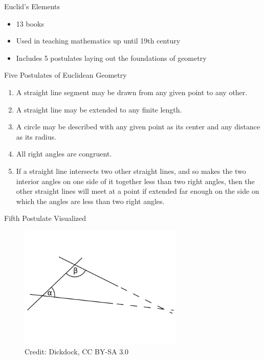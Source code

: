 \documentclass[utf8]{beamer}
\begin{document}
\begin{frame}{Euclid's Elements}
\begin{itemize}
\item 13 books
\item Used in teaching mathematics up until 19th century
\item Includes 5 postulates laying out the foundations of geometry
\end{itemize}
\end{frame}

\begin{frame}{Five Postulates of Euclidean Geometry}
\begin{enumerate}
\item A straight line segment may be drawn from any given point to any other.
\item A straight line may be extended to any finite length.
\item A circle may be described with any given point as its center and any distance as its radius.
\item All right angles are congruent.
\item If a straight line intersects two other straight lines, and so makes the two interior angles on one side of it
together less than two right angles, then the other straight lines will meet at a point if extended far enough on the
side on which the angles are less than two right angles.
\end{enumerate}
\end{frame}

\begin{frame}{Fifth Postulate Visualized}
\begin{figure}
\centering
\includegraphics[width=0.7\textwidth]{images/fifth-postulate.png}
\\
\tiny Credit: Dickdock, CC BY-SA 3.0
\end{figure}
\end{frame}
\end{document}
